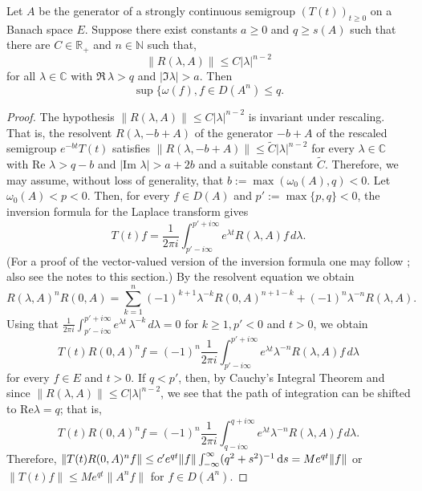 \begin{theorem}\label{thm:a4-1.9} Let $A$ be the generator of a strongly continuous semigroup $(T(t))_{t \geq 0}$ on a Banach space $E$. 
Suppose there exist constants $a \geq 0$ and $q \geq s(A)$ such that there are $C \in \mathbb{R}_+$ and $n \in \mathbb{N}$ such that, 
    \[
    \| R(\lambda, A) \| \leq C | \lambda |^{n-2}
    \]
    for all $\lambda \in \mathbb{C}$ with $\Re\,\lambda > q$ and $| \Im \lambda | > a$. 
    Then
    \[
    \sup \{ \omega(f),  f \in D(A^n)  \leq q.\]
\end{theorem}

\begin{proof} The hypothesis $\| R(\lambda, A) \| \leq C | \lambda |^{n-2}$ is invariant under rescaling. 
That is, the resolvent $R(\lambda, -b+A)$ of the generator $-b+A$ of the rescaled semigroup $e^{-bt} T(t)$ satisfies  
$\| R(\lambda, -b+A) \| \leq \tilde{C} | \lambda |^{n-2}$ for every $\lambda \in \mathbb{C}$ with $\text{Re } \lambda > q-b$ and $| \text{Im } \lambda | > a+2b$ and a suitable constant $\tilde{C}$. 
Therefore, we may assume, without loss of generality, that $b := \max(\omega_0(A), q) < 0$. 
Let $\omega_0(A) < p < 0$. 
Then, for every $f \in D(A)$ and $p' := \max\{p, q\} < 0$, the inversion formula for the Laplace transform gives 
\begin{equation} \label{eq:a4-1.12}
T(t) f = \frac{1}{2\pi i} \int_{p' - i\infty}^{p' + i\infty} e^{\lambda t} R(\lambda, A) f \, d\lambda.
\end{equation}
\noindent (For a proof of the vector-valued version of the inversion formula one may follow \citet[p.66]{widder:1946}; also see the notes to this section.)
By the resolvent equation we obtain 
   \[ R(\lambda, A)^n R(0, A) = \sum_{k=1}^{n} (-1)^{k+1} \lambda^{-k} R(0, A)^{n+1-k} + (-1)^n \lambda^{-n} R(\lambda, A).
   \]
\noindent  Using that  
\( \frac {1}{2\pi i} \int_{p' - i\infty}^{p' + i\infty} e^{\lambda t} \, \lambda^{-k} \, d\lambda = 0 \) for \( k \geq 1, p' < 0 \) and \( t > 0\), we obtain
 \begin{equation}\label{eq:a4-1.13}
   T(t) R(0, A)^n f = (-1)^n \frac{1}{2\pi i} \int_{p' - i\infty}^{p' + i\infty} e^{\lambda t} \lambda^{-n} R(\lambda, A) f \, d\lambda
    \end{equation}
    \noindent for every $f \in E$ and $t > 0$.
    \noindent If $q < p'$, then, by Cauchy's Integral Theorem and since $\| R(\lambda, A) \| \leq C | \lambda |^{n-2}$, we see that the path of integration can be shifted to $\text{Re} \lambda = q$; 
    \noindent that is,
    \[
    T(t) R(0, A)^n f = (-1)^n \frac{1}{2\pi i} \int_{q - i\infty}^{q + i\infty} e^{\lambda t} \lambda^{-n} R(\lambda, A) f \, d\lambda.
    \]
Therefore,  
\(
\| T(t) R(0,A)^n f \| \leq c' e^{q t} \| f \| \int_{-\infty}^{\infty} (q^2 + s^2)^{-1}\mathop{}\!\mathrm{d}{s} = M e^{q t} \| f \|\) 
or 
\(
\| T(t) f \| \leq M e^{q t} \| A^n f \|\) for \(f \in D(A^n)\).
\end{proof}



